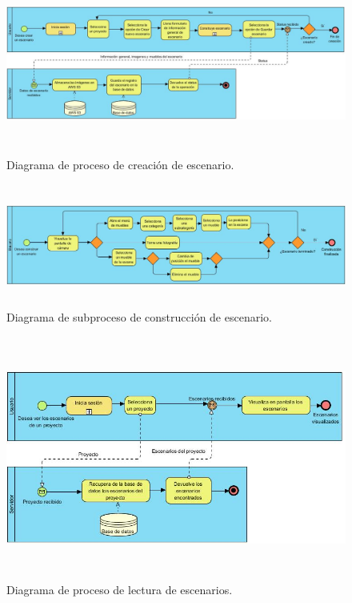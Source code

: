 \begin{figure}[h!]
	\centering
	\includegraphics[width=18cm,height=6cm]{imagenes/desarrollo/diagramas/BPMN_CREATE_SCENARIO.jpg}
	\caption{Diagrama de proceso de creación de escenario.}
	\label{fig:createsc}
\end{figure}
\begin{figure}[h!]
	\centering
	\includegraphics[width=18cm,height=4cm]{imagenes/desarrollo/diagramas/BPMN_BUILD_SCENARIO.jpg}
	\caption{Diagrama de subproceso de construcción de escenario.}
	\label{fig:buildsc}
\end{figure}
\begin{figure}[h!]
	\centering
	\includegraphics[width=17cm,height=8cm]{imagenes/desarrollo/diagramas/BPMN_READ_SCENARIOS.jpg}
	\caption{Diagrama de proceso de lectura de escenarios.}
	\label{fig:readsc}
\end{figure}
